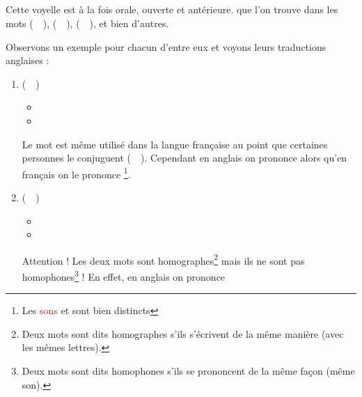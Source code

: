\subsection{}\label{subsec:afr}

Cette voyelle est à la fois orale, ouverte et antérieure. 
que l'on trouve dans les mots  (~~),
 (~~),  (~~), et bien
d'autres. 

Observons un exemple pour chacun d'entre eux et voyons leurs
traductions anglaises :\par

\begin{enumerate}
\item {} (~~)
  \begin{itemize}
  \item {}
    \item {}
    \end{itemize}
    Le mot  est même utilisé dans la langue française
    au point que certaines personnes le conjuguent (~~).
    Cependant en anglais on
    prononce
    \href{https://en.oxforddictionaries.com/definition/stop}{}
    alors qu'en français on le prononce
    \href{http://www.wordreference.com/fren/stop}{}\footnote{Les
      \textcolor{red}{sons}  et  sont bien distincts}.
\item {} (~~)
  \begin{itemize}
  \item {}
  \item {}
  \end{itemize}
    Attention ! Les deux mots sont homographes\footnote{Deux mots sont
      dits homographes s'ils s'écrivent de la même manière (avec les
      mêmes lettres).} mais ils ne sont pas homophones\footnote{Deux
      mots sont dits homophones s'ils se prononcent de la même façon
      (même son).} ! En effet, en anglais on prononce
    \href{https://en.oxforddictionaries.com/definition/bar}{}

\end{enumerate}
